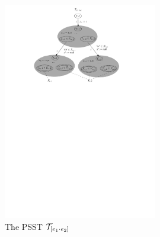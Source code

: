 		\begin{figure}[ht]
			\centering
			\includegraphics[width = 0.6\textwidth]{reg2pfa-2.pdf}
			\caption{The PSST $\mathcal{T}_{[e_1\cdot e_2]}$}
			\label{fig-reg2pfa-2}
		\end{figure}  
	


